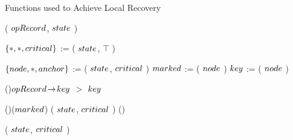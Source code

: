 \begin{limitscope}
\begin{comment}
   
   \tcp{traverse the tree from top to down}
	 
	 $\result$ := \TraverseTree( $\opRecord$, $\seekRecord$ )\;
	 \label{lin:local-seek|search:traverse|tree}	
	 \If{\LNot($\result$)}	
	 {
	     \tcp{check if the key has moved up in the path}
	     $\result$ := \ExamineStack( $\opRecord$, $\seekRecord$ )\;
			 \label{lin:local-seek|search:examine|stack}
	 }
	
	 \tcp{return the outcome}
	 \PopulateSeekRecord( $\seekRecord$, $\traversalRecord$ )\;
	 \Return $\result$\;
   \label{lin:local-seek|search:end}
}
\end{algorithm}

\end{comment}




\begin{algorithm}[tb]
\caption{Functions used to Achieve Local Recovery} 
\label{algo:local-local:recovery}
\DefineKeyWords
\DontPrintSemicolon
\Boolean \FindAdmissible( $opRecord$, $state$ )\;
\PrintSemicolon
\label{lin:local-test|safety:begin}
\Begin
{
   
	
	 $\{  \ast, \ast, critical  \}$ := \GetFullEntry( $state$, $\top$ )\;
	 \While{\True}
	 {
	    \label{lin:local-test|safety:while:begin}
	    $\{  node, \ast, anchor  \}$ := \GetFullEntry( $state$, $critical$ )\;
			$marked$ := \IsMarked( $node$ )\; 
			$key$ := \GetKey( $node$ )\;
			
			\BlankLine
			
			\uIf(){$opRecord \!\rightarrow\! key$ $>$ $key$}
		  {
			   \label{lin:local-test|safety:while:consistent:begin}
				
				 \uIf(){\LNot($marked$)}
				 {  
				    \RememberCritical( $state$, $critical$ )\;
				    \Return \True\;
				 }
				 \Else()
				 {
						   \RemoveUntilCritical( $state$, $critical$ )\;
							 \Return \False\;
						
}}}}
\end{algorithm}
\end{limitscope}
